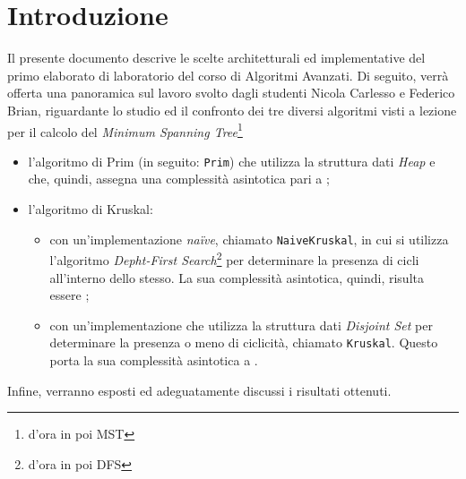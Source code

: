 \section{Introduzione}
Il presente documento descrive le scelte architetturali ed implementative del primo elaborato di laboratorio del corso di Algoritmi Avanzati. Di seguito, verrà offerta una panoramica sul lavoro svolto dagli studenti Nicola Carlesso e Federico Brian, riguardante lo studio ed il confronto dei tre diversi algoritmi visti a lezione per il calcolo del \emph{Minimum Spanning Tree}\footnote{d'ora in poi MST} 
\begin{itemize}
	\item l'algoritmo di Prim (in seguito: \texttt{Prim}) che utilizza la struttura dati \emph{Heap} e che, quindi, assegna una complessità asintotica pari a ;
	\item l'algoritmo di Kruskal:
	\begin{itemize}
		\item con un'implementazione \emph{na\"ive}, chiamato \texttt{NaiveKruskal}, in cui si utilizza l'algoritmo \emph{Depht-First Search}\footnote{d'ora in poi DFS} per determinare la presenza di cicli all'interno dello stesso. La sua complessità asintotica, quindi, risulta essere ;
		\item con un'implementazione che utilizza la struttura dati \emph{Disjoint Set} per determinare la presenza o meno di ciclicità, chiamato \texttt{Kruskal}. Questo porta la sua complessità asintotica a .
	\end{itemize}
\end{itemize}
 Infine, verranno esposti ed adeguatamente discussi i risultati ottenuti.

